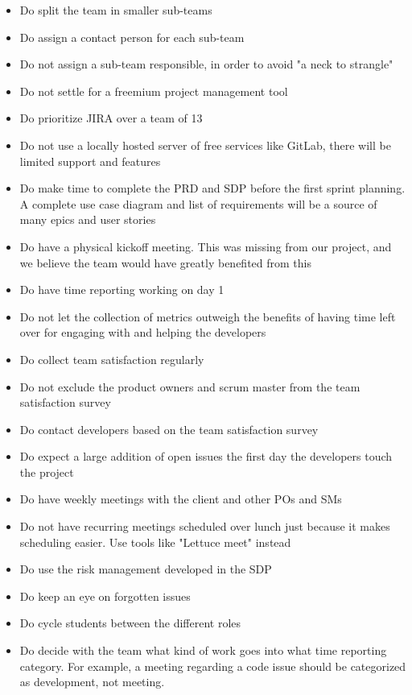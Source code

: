 \documentclass{article}
\begin{document}
\begin{itemize}
    \item Do split the team in smaller sub-teams
    \item Do assign a contact person for each sub-team
    \item Do not assign a sub-team responsible, in order to avoid "a neck to strangle"
    \item Do not settle for a freemium project management tool
    \item Do prioritize JIRA over a team of 13
    \item Do not use a locally hosted server of free services like GitLab, there will be limited support and features
    \item Do make time to complete the PRD and SDP before the first sprint planning. A complete use case diagram and list of requirements will be a source of many epics and user stories
    \item Do have a physical kickoff meeting. This was missing from our project, and we believe the team would have greatly benefited from this
    \item Do have time reporting working on day 1
    \item Do not let the collection of metrics outweigh the benefits of having time left over for engaging with and helping the developers
    \item Do collect team satisfaction regularly
    \item Do not exclude the product owners and scrum master from the team satisfaction survey
    \item Do contact developers based on the team satisfaction survey
    \item Do expect a large addition of open issues the first day the developers touch the project
    \item Do have weekly meetings with the client and other POs and SMs
    \item Do not have recurring meetings scheduled over lunch just because it makes scheduling easier. Use tools like "Lettuce meet" instead
    \item Do use the risk management developed in the SDP
    \item Do keep an eye on forgotten issues
    \item Do cycle students between the different roles
    \item Do decide with the team what kind of work goes into what time reporting category. For example, a meeting regarding a code issue should be categorized as development, not meeting.
\end{itemize}
\end{document}
